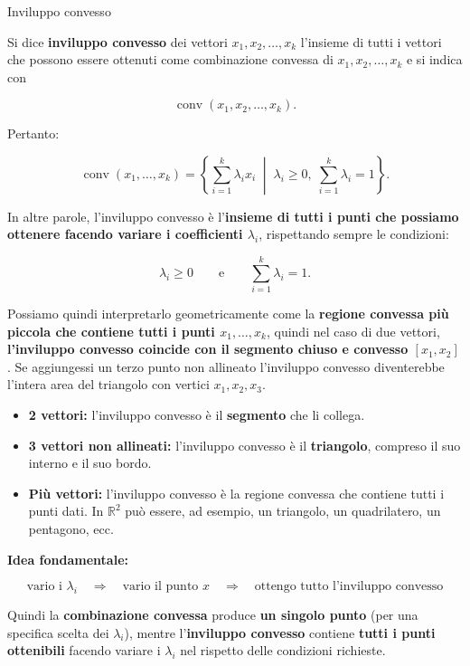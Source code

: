 \begin{definition}{Inviluppo convesso}

Si dice \textbf{inviluppo convesso} dei vettori
$x_1,x_2,\ldots,x_k$ l'insieme di tutti i vettori che possono essere ottenuti come combinazione convessa di
$x_1,x_2,\ldots,x_k$ e si indica con

$$
\operatorname{conv}(x_1,x_2,\ldots,x_k).
$$

Pertanto:

$$
\boxed{
\operatorname{conv}(x_1,\ldots,x_k)
=
\left\{
\sum_{i=1}^{k}\lambda_i x_i
\;\middle|\;
\lambda_i\geq0,\;
\sum_{i=1}^{k}\lambda_i=1
\right\}.
}
$$

In altre parole, l'inviluppo convesso è l'\textbf{insieme di tutti i punti che possiamo ottenere facendo variare i coefficienti $\lambda_i$}, rispettando sempre le condizioni:

$$
\lambda_i\geq0
\qquad\text{e}\qquad
\sum_{i=1}^{k}\lambda_i=1.
$$

Possiamo quindi interpretarlo geometricamente come la \textbf{regione convessa più piccola che contiene tutti i punti $x_1,\ldots,x_k$}, quindi nel caso di due vettori,
\textbf{l'inviluppo convesso coincide con il segmento chiuso e convesso $[x_1,x_2]$}. Se aggiungessi un terzo punto non allineato l'inviluppo convesso diventerebbe l'intera area del triangolo con vertici $x_1, x_2, x_3$.

\begin{itemize}

\item \textbf{2 vettori:} l'inviluppo convesso è il \textbf{segmento} che li collega.

\item \textbf{3 vettori non allineati:} l'inviluppo convesso è il \textbf{triangolo}, compreso il suo interno e il suo bordo.

\item \textbf{Più vettori:} l'inviluppo convesso è la regione convessa che contiene tutti i punti dati. In $\mathbb{R}^2$ può essere, ad esempio, un triangolo, un quadrilatero, un pentagono, ecc.

\end{itemize}

\textbf{Idea fondamentale:}

$$
\boxed{
\text{vario i }\lambda_i
\quad\Longrightarrow\quad
\text{vario il punto }x
\quad\Longrightarrow\quad
\text{ottengo tutto l'inviluppo convesso}
}
$$

Quindi la \textbf{combinazione convessa} produce \textbf{un singolo punto} (per una specifica scelta dei $\lambda_i$), mentre l'\textbf{inviluppo convesso} contiene \textbf{tutti i punti ottenibili} facendo variare i $\lambda_i$ nel rispetto delle condizioni richieste.

\end{definition}


